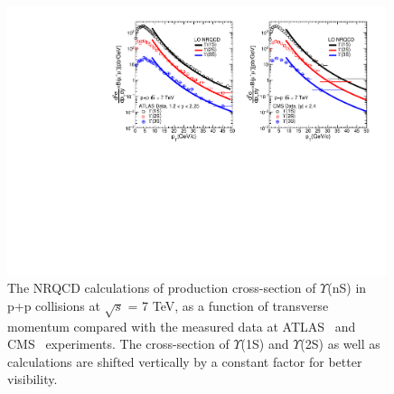 \begin{figure}
  \centering
  \includegraphics[width=0.99\textwidth]{Figures/NRQCD_Beauty/Fig_CMS_ATLAS_YnS_7TeV_Pt.pdf}
  \caption{\small{The NRQCD calculations of production cross-section of $\Upsilon$(nS) in p+p collisions at 
      $\sqrt{s}$ = 7 TeV, as a function of transverse momentum compared with the measured data 
      at ATLAS~\cite{Aad:2012dlq} and CMS~\cite{Chatrchyan:2013yna} experiments. The cross-section of $\Upsilon$(1S)
      and $\Upsilon$(2S) as well as calculations are shifted vertically by a constant factor for better visibility.}}
  \label{Fig:SigmaYnSCMS13TeV}
\end{figure}



